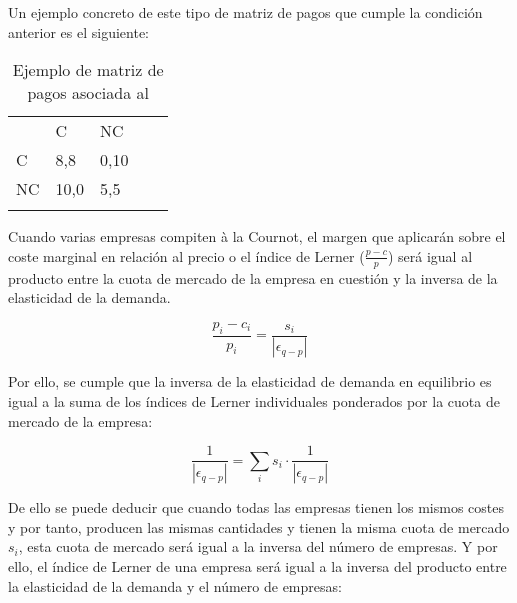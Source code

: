 \documentclass{nuevotema}
\begin{document}
Un ejemplo concreto de este tipo de matriz de pagos que cumple la condición anterior es el siguiente:

\begin{table}[htbp]
    \centering
    \caption{Ejemplo de matriz de pagos asociada al }
    \label{prisioneroejemplo}
    \begin{tabular}{lllll}
        \cline{1-3}
        \multicolumn{1}{|l|}{}   & \multicolumn{1}{l|}{C}   & \multicolumn{1}{l|}{NC}  &  &  \\ \cline{1-3}
        \multicolumn{1}{|l|}{C}  & \multicolumn{1}{l|}{8,8} & \multicolumn{1}{l|}{0,10} &  &  \\ \cline{1-3}
        \multicolumn{1}{|l|}{NC} & \multicolumn{1}{l|}{10,0} & \multicolumn{1}{l|}{5,5} &  &  \\ \cline{1-3}
        &                          &                          &  & 
    \end{tabular}
\end{table}


Cuando varias empresas compiten à la Cournot, el margen que aplicarán sobre el coste marginal en relación al precio o el índice de Lerner ($\frac{p-c}{p}$) será igual al producto entre la cuota de mercado de la empresa en cuestión y la inversa de la elasticidad de la demanda. 

\begin{equation*}
	\frac{p_i - c_i}{p_i} = \frac{s_i}{\left| \epsilon_{q-p} \right|}
\end{equation*}

Por ello, se cumple que la inversa de la elasticidad de demanda en equilibrio es igual a la suma de los índices de Lerner individuales ponderados por la cuota de mercado de la empresa:

\begin{equation*}
\frac{1}{\left| \epsilon_{q-p} \right| } = \sum_i s_i \cdot \frac{1}{\left| \epsilon_{q-p} \right| } 
\end{equation*}

De ello se puede deducir que cuando todas las empresas tienen los mismos costes y por tanto, producen las mismas cantidades y tienen la misma cuota de mercado $s_i$, esta cuota de mercado será igual a la inversa del número de empresas. Y por ello, el índice de Lerner de una empresa será igual a la inversa del producto entre la elasticidad de la demanda y el número de empresas:
\end{document}
